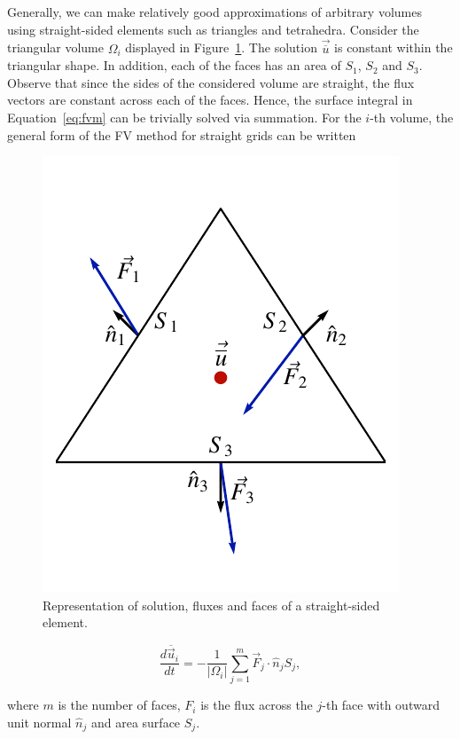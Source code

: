 Generally, we can make relatively good approximations of arbitrary volumes using straight-sided elements such as triangles and tetrahedra. Consider the triangular volume $\Omega_i$ displayed in Figure~\ref{fig:fv_straightsided}. The solution $\vec{\overline u}$ is constant within the triangular shape. In addition, each of the faces has an area of $S_1$, $S_2$ and $S_3$. Observe that since the sides of the considered volume are straight, the flux vectors are constant across each of the faces. Hence, the surface integral in Equation~\ref{eq:fvm} can be trivially solved via summation. For the $i$-th volume, the general form of the FV method for straight grids can be written
\begin{figure}[htbp]
 \centering
 \includegraphics[width=0.3\linewidth]{Pictures/fv_cellavg}
 \caption{Representation of solution, fluxes and faces of a straight-sided element.}
 \label{fig:fv_straightsided}
\end{figure}
\begin{eqBox}
 \begin{equation}
 \frac{d \overline{\vec u}_i}{dt} = - \frac{1}{|\Omega_i|} \sum_{j=1}^{m} \vec F_j \cdot \hat n_j S_j,
 \label{eq:fv_straightsided}
 \end{equation}
\end{eqBox}
where $m$ is the number of faces, $F_i$ is the flux across the $j$-th face with outward unit normal $\hat n_j$ and area surface $S_j$.


